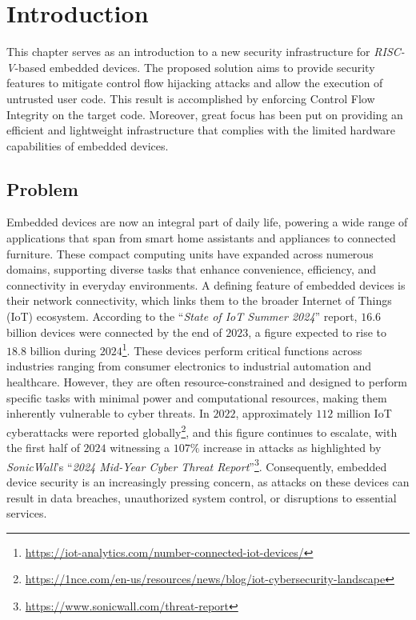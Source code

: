 \chapter{Introduction}
\label{cha:introduction}

This chapter serves as an introduction to a new security infrastructure for
\textit{RISC-V}-based embedded devices. The proposed solution aims to provide
security features to mitigate control flow hijacking attacks and allow the
execution of untrusted user code. This result is accomplished by enforcing Control
Flow Integrity on the target code. Moreover, great focus has been put on providing
an efficient and lightweight infrastructure that complies with the limited hardware
capabilities of embedded devices.

\section{Problem}
\label{sec:intro_context}

Embedded devices are now an integral part of daily life, powering a wide range of
applications that span from smart home assistants and appliances to connected furniture.
These compact computing units have expanded across numerous domains, supporting diverse
tasks that enhance convenience, efficiency, and connectivity in everyday environments.
A defining feature of embedded devices is their network connectivity, which links
them to the broader Internet of Things (IoT) ecosystem. According to the ``\textit{State
of IoT Summer 2024}'' report, $16.6$ billion devices were connected by the end
of $2023$, a figure expected to rise to $18.8$ billion during $2024$\footnote{\url{https://iot-analytics.com/number-connected-iot-devices/}}.
These devices perform critical functions across industries ranging from consumer
electronics to industrial automation and healthcare. However, they are often resource-constrained
and designed to perform specific tasks with minimal power and computational resources,
making them inherently vulnerable to cyber threats. In $2022$, approximately
$112$ million IoT cyberattacks were reported globally\footnote{\url{https://1nce.com/en-us/resources/news/blog/iot-cybersecurity-landscape}},
and this figure continues to escalate, with the first half of $2024$ witnessing a
$107\%$ increase in attacks as highlighted by \textit{SonicWall}'s ``\textit{2024
Mid-Year Cyber Threat Report}''\footnote{\url{https://www.sonicwall.com/threat-report}}.
Consequently, embedded device security is an increasingly pressing concern, as attacks
on these devices can result in data breaches, unauthorized system control, or disruptions
to essential services.

